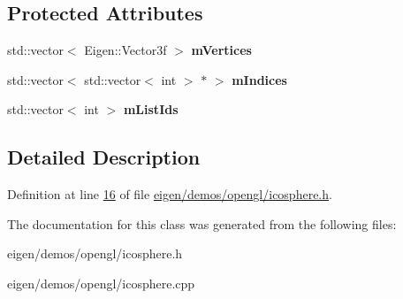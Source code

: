 \subsection*{Protected Attributes}
\begin{DoxyCompactItemize}
\item 
\mbox{\label{class_ico_sphere_a3e98a544df3d5b87b1266f665459e44d}} 
std\+::vector$<$ Eigen\+::\+Vector3f $>$ {\bfseries m\+Vertices}
\item 
\mbox{\label{class_ico_sphere_a24e274c27924c46b55e5d04453e51358}} 
std\+::vector$<$ std\+::vector$<$ int $>$ $\ast$ $>$ {\bfseries m\+Indices}
\item 
\mbox{\label{class_ico_sphere_a7e7dafe1672b7d8fd1dd53691afb4f09}} 
std\+::vector$<$ int $>$ {\bfseries m\+List\+Ids}
\end{DoxyCompactItemize}


\subsection{Detailed Description}


Definition at line \hyperlink{eigen_2demos_2opengl_2icosphere_8h_source_l00016}{16} of file \hyperlink{eigen_2demos_2opengl_2icosphere_8h_source}{eigen/demos/opengl/icosphere.\+h}.



The documentation for this class was generated from the following files\+:\begin{DoxyCompactItemize}
\item 
eigen/demos/opengl/icosphere.\+h\item 
eigen/demos/opengl/icosphere.\+cpp\end{DoxyCompactItemize}
